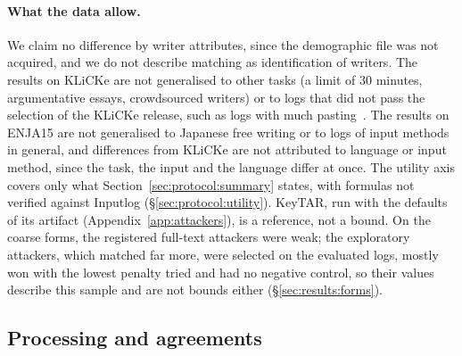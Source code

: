 \paragraph{What the data allow.}
We claim no difference by writer attributes, since the demographic file was not acquired, and we do not describe matching
as identification of writers. The results on KLiCKe are not generalised to other tasks (a limit of 30 minutes,
argumentative essays, crowdsourced writers) or to logs that did not pass the selection of the KLiCKe release, such as
logs with much pasting~\cite{tian2025klicke}. The results on ENJA15 are not generalised to Japanese free writing or to
logs of input methods in general, and differences from KLiCKe are not attributed to language or input method, since
the task, the input and the language differ at once. The utility axis covers only what
Section~\ref{sec:protocol:summary} states, with formulas not verified against Inputlog (\S\ref{sec:protocol:utility}). KeyTAR, run with the defaults of its artifact (Appendix~\ref{app:attackers}), is a reference, not a bound. On
the coarse forms, the registered full-text attackers were weak; the exploratory attackers, which matched far more,
were selected on the evaluated logs, mostly won with the lowest penalty tried and had no negative control, so their
values describe this sample and are not bounds either (\S\ref{sec:results:forms}).

\subsection{Processing and agreements}
\label{sec:discussion:agreements}

